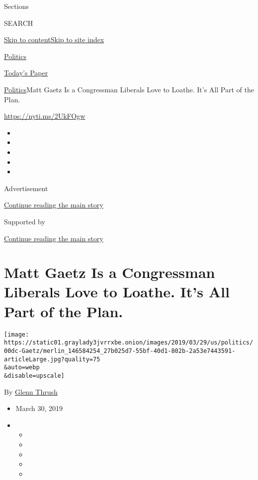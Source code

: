 Sections

SEARCH

\protect\hyperlink{site-content}{Skip to
content}\protect\hyperlink{site-index}{Skip to site index}

\href{https://www.nytimes3xbfgragh.onion/section/politics}{Politics}

\href{https://myaccount.nytimes3xbfgragh.onion/auth/login?response_type=cookie\&client_id=vi}{}

\href{https://www.nytimes3xbfgragh.onion/section/todayspaper}{Today's
Paper}

\href{/section/politics}{Politics}\textbar{}Matt Gaetz Is a Congressman
Liberals Love to Loathe. It's All Part of the Plan.

\url{https://nyti.ms/2UkFOgw}

\begin{itemize}
\item
\item
\item
\item
\item
\end{itemize}

Advertisement

\protect\hyperlink{after-top}{Continue reading the main story}

Supported by

\protect\hyperlink{after-sponsor}{Continue reading the main story}

\hypertarget{matt-gaetz-is-a-congressman-liberals-love-to-loathe-its-all-part-of-the-plan}{%
\section{Matt Gaetz Is a Congressman Liberals Love to Loathe. It's All
Part of the
Plan.}\label{matt-gaetz-is-a-congressman-liberals-love-to-loathe-its-all-part-of-the-plan}}

\texttt{[image: https://static01.graylady3jvrrxbe.onion/images/2019/03/29/us/politics/00dc-Gaetz/merlin\_146584254\_27b025d7-55bf-40d1-802b-2a53e7443591-articleLarge.jpg?quality=75\\\&auto=webp\\\&disable=upscale]}

By \href{https://www.nytimes3xbfgragh.onion/by/glenn-thrush}{Glenn
Thrush}

\begin{itemize}
\item
  March 30, 2019
\item
  \begin{itemize}
  \item
  \item
  \item
  \item
  \item
  \end{itemize}
\end{itemize}


